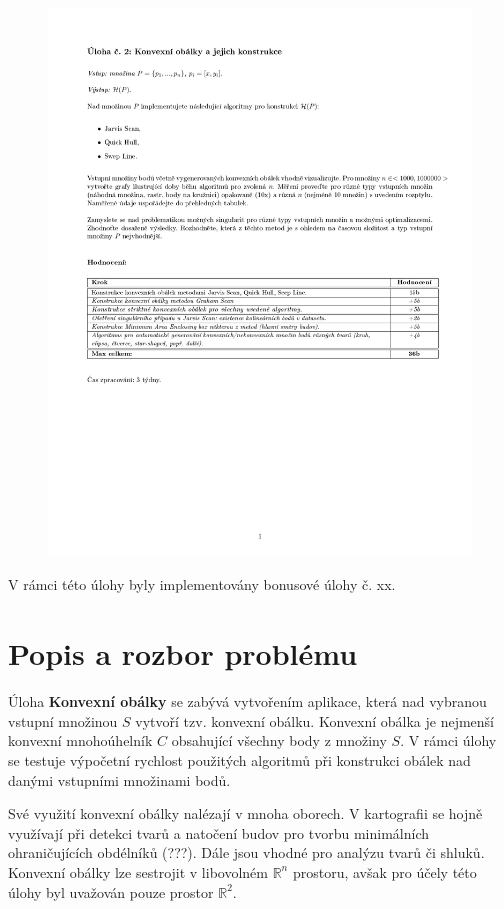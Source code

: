 \documentclass[a4paper, 12pt]{article}
\begin{document}
\begin{figure}[h!]
	\includegraphics[clip, trim=0cm 10cm 0cm 3cm, width=1.0\textwidth]{./pictures/zadani02.pdf}
\end{figure}

V rámci této úlohy byly implementovány bonusové úlohy č. xx.
\clearpage

\section{Popis a rozbor problému}
Úloha \textbf{Konvexní obálky} se zabývá vytvořením aplikace, která nad vybranou vstupní množinou $S$ vytvoří tzv. konvexní obálku. Konvexní obálka je nejmenší konvexní mnoho\-úhelník $C$ obsahující všechny body z množiny $S$. V rámci úlohy se testuje výpočetní rychlost použitých algoritmů při konstrukci obálek nad danými vstupními množinami bodů. 

Své využití konvexní obálky nalézají v mnoha oborech. V kartografii se hojně využívají při detekci tvarů a natočení budov pro tvorbu minimálních ohraničujících obdélníků (???). Dále jsou vhodné pro analýzu tvarů či shluků. Konvexní obálky lze sestrojit v libovolném $\mathbb{R}^n$ prostoru, avšak pro účely této úlohy byl uvažován pouze prostor $\mathbb{R}^2$.
\end{document}
